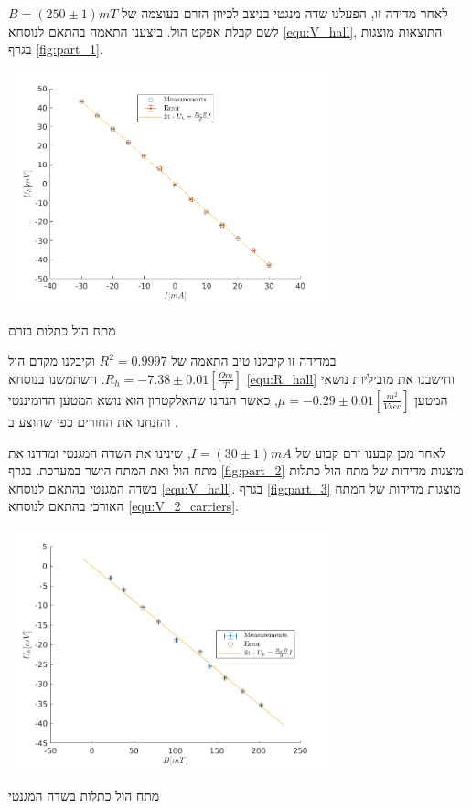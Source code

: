 \documentclass{article}
\begin{document}
לאחר מדידה זו, הפעלנו שדה מנגטי בניצב לכיוון הזרם בעוצמה של 
$B = (250 \pm 1) mT$ 
לשם קבלת אפקט הול. ביצענו התאמה בהתאם לנוסחא
\ref{equ:V_hall},
התוצאות מוצגות בגרף
\ref{fig:part_1}.
\begin{graph}[H]
    \centering
    \includegraphics[width=0.7\textwidth]{part1 - R_h.png}
    \caption{מתח הול כתלות בזרם}
    \label{fig:part_1}
\end{graph}


במדידה זו קיבלנו טיב התאמה של
$R^2 = 0.9997$
וקיבלנו מקדם הול
$R_h = -7.38 \pm 0.01 [\frac{\Omega m}{T}]$.
השתמשנו בנוסחא
\ref{equ:R_hall}
וחישבנו את מוביליות נושאי המטען 
$\mu = -0.29 \pm 0.01 [\frac{m^2}{V sec}] $,
כאשר הנחנו שהאלקטרון הוא נושא המטען הדומיננטי והזנחנו את החורים כפי שהוצע ב
\cite{Manual}.

לאחר מכן קבענו זרם קבוע של
$I = (30 \pm 1) mA$,
שינינו את השדה המגנטי
ומדדנו את מתח הול ואת המתח הישר במערכת.
בגרף
\ref{fig:part_2}
מוצגות מדידות של מתח הול כתלות בשדה המגנטי
בהתאם לנוסחא
\ref{equ:V_hall}.
בגרף
\ref{fig:part_3}
מוצגות מדידות של המתח האורכי
בהתאם לנוסחא
\ref{equ:V_2_carriers}.

\begin{graph}[H]
    \centering
    \includegraphics[width=0.7\textwidth]{part2 - R_h.png}
    \caption{מתח הול כתלות בשדה המגנטי}
    \label{fig:part_2}
\end{graph}
\end{document}
